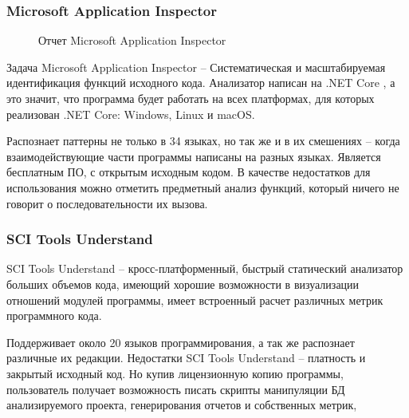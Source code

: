 \subsubsection{Microsoft Application Inspector}\label{sec:ch1/sec3/sub1/sub1}

\begin{figure}[!htbp]
    \caption{Отчет Microsoft Application Inspector\label{fig:ms-app-inspector}}
\end{figure}
Задача Microsoft Application Inspector -- Систематическая и масштабируемая идентификация функций исходного кода.
Анализатор написан на .NET Core \autocite{net-core}, а это значит, что программа будет работать на всех платформах,
для которых реализован .NET Core: Windows, Linux и macOS.

Распознает паттерны не только в 34 языках, но так же и в их смешениях -- когда взаимодействующие части программы
написаны на разных языках. Является бесплатным ПО, с открытым исходным кодом.
В качестве недостатков для использования можно отметить предметный анализ функций, который ничего не говорит 
о последовательности их вызова.

\subsubsection{SCI Tools Understand}\label{sec:ch1/sec3/sub1/sub2}
SCI Tools Understand -- кросс-платформенный, быстрый статический анализатор больших объемов кода,
имеющий хорошие возможности в визуализации отношений модулей программы,
имеет встроенный расчет различных метрик программного кода.

Поддерживает около 20 языков программирования, а так же распознает различные их редакции.
Недостатки SCI Tools Understand -- платность и закрытый исходный код. Но купив лицензионную копию
программы, пользователь получает возможность писать скрипты манипуляции БД анализируемого проекта, 
генерирования отчетов и собственных метрик, 

